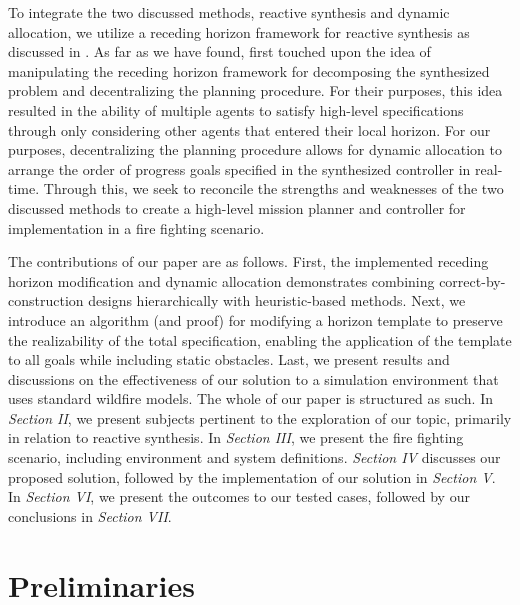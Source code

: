\documentclass{ieeeaccess}
\begin{document}
To integrate the two discussed methods, reactive synthesis and dynamic allocation, we utilize a receding horizon framework for reactive synthesis as discussed in \cite{c10}. As far as we have found, \cite{c6} first touched upon the idea of manipulating the receding horizon framework for decomposing the synthesized problem and decentralizing the planning procedure. For their purposes, this idea resulted in the ability of multiple agents to satisfy high-level specifications through only considering other agents that entered their local horizon. For our purposes, decentralizing the planning procedure allows for dynamic allocation to arrange the order of progress goals specified in the synthesized controller in real-time. Through this, we seek to reconcile the strengths and weaknesses of the two discussed methods to create a high-level mission planner and controller for implementation in a fire fighting scenario. 


The contributions of our paper are as follows. First, the implemented receding horizon modification and dynamic allocation demonstrates combining correct-by-construction designs hierarchically with heuristic-based methods. Next, we introduce an algorithm (and proof) for modifying a horizon template to preserve the realizability of the total specification, enabling the application of the template to all goals while including static obstacles. Last, we present results and discussions on the effectiveness of our solution to a simulation environment that uses standard wildfire models. The whole of our paper is structured as such. In \textit{Section II}, we present subjects pertinent to the exploration of our topic, primarily in relation to reactive synthesis. In \textit{Section III}, we present the fire fighting scenario, including environment and system definitions. \textit{Section IV} discusses our proposed solution, followed by the implementation of our solution in \textit{Section V}. In \textit{Section VI}, we present the outcomes to our tested cases, followed by our conclusions in \textit{Section VII}. 

\section{Preliminaries}
\end{document}
